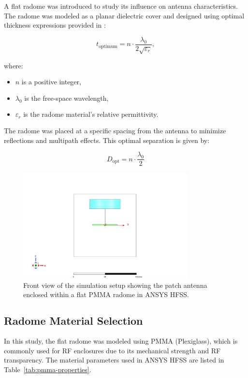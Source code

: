 A flat radome was introduced to study its influence on antenna characteristics. The radome was modeled as a planar dielectric cover and designed using optimal thickness expressions provided in \cite{swra705}:

\begin{equation}
t_{\text{optimum}} = n \cdot \frac{\lambda_0}{2 \sqrt{\varepsilon_r}},
\end{equation}

where:
\begin{itemize}
    \item $n$ is a positive integer,
    \item $\lambda_0$ is the free-space wavelength,
    \item $\varepsilon_r$ is the radome material's relative permittivity.
\end{itemize}

The radome was placed at a specific spacing from the antenna to minimize reflections and multipath effects. This optimal separation is given by:

\begin{equation}
D_{\text{opt}} = n \cdot \frac{\lambda_0}{2}
\end{equation}

\begin{figure}[H]
\centering
\includegraphics[width=0.8\textwidth]{figures/flat_radome.jpeg}
\caption{Front view of the simulation setup showing the patch antenna enclosed within a flat PMMA radome in ANSYS HFSS.}
\label{fig:flat_radome}
\end{figure}

\subsection*{Radome Material Selection}

In this study, the flat radome was modeled using PMMA (Plexiglass), which is commonly used for RF enclosures due to its mechanical strength and RF transparency. The material parameters used in ANSYS HFSS are listed in Table~\ref{tab:pmma-properties}.

